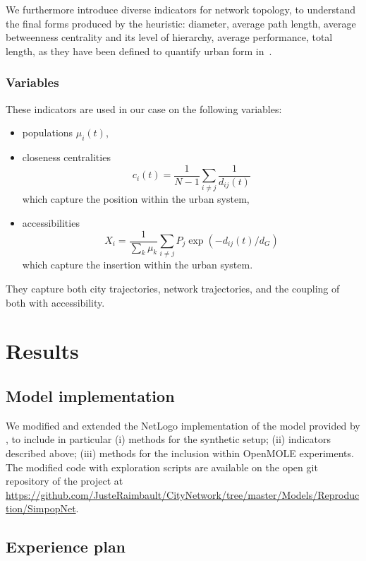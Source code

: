 We furthermore introduce diverse indicators for network topology, to understand the final forms produced by the heuristic: diameter, average path length, average betweenness centrality and its level of hierarchy, average performance, total length, as they have been defined to quantify urban form in~\cite{2018arXiv180505195R}.


\subsubsection{Variables}


These indicators are used in our case on the following variables:
\begin{itemize}
	\item populations $\mu_i(t)$,
	\item closeness centralities
	\[c_i(t) = \frac{1}{N-1}\sum_{i\neq j} \frac{1}{d_{ij}(t)}\]
	which capture the position within the urban system,
	\item accessibilities \[X_i = \frac{1}{\sum_k \mu_k}\sum_{i\neq j} P_j \exp{\left(- d_{ij}(t)/d_G\right)}\] which capture the insertion within the urban system.
\end{itemize}

They capture both city trajectories, network trajectories, and the coupling of both with accessibility.



\section{Results}


\subsection{Model implementation}

We modified and extended the NetLogo implementation of the model provided by \cite{schmitt2014modelisation}, to include in particular (i) methods for the synthetic setup; (ii) indicators described above; (iii) methods for the inclusion within OpenMOLE experiments. The modified code with exploration scripts are available on the open git repository of the project at \url{https://github.com/JusteRaimbault/CityNetwork/tree/master/Models/Reproduction/SimpopNet}.



\subsection{Experience plan}

